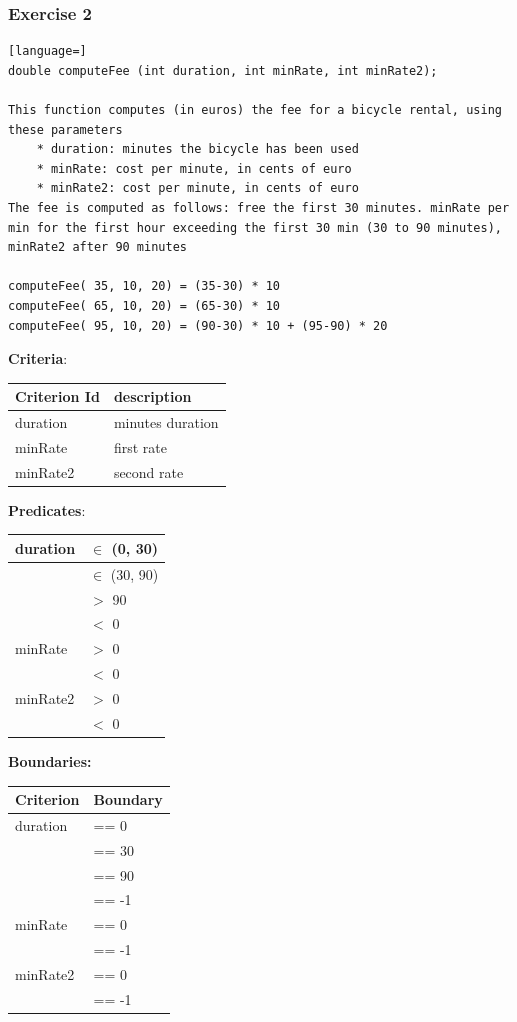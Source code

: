 \documentclass[12pt]{article}
\begin{document}
\subsubsection{Exercise 2}
\begin{lstlisting}[language=]
double computeFee (int duration, int minRate, int minRate2);

This function computes (in euros) the fee for a bicycle rental, using these parameters
    * duration: minutes the bicycle has been used
    * minRate: cost per minute, in cents of euro
    * minRate2: cost per minute, in cents of euro
The fee is computed as follows: free the first 30 minutes. minRate per min for the first hour exceeding the first 30 min (30 to 90 minutes), minRate2 after 90 minutes

computeFee( 35, 10, 20) = (35-30) * 10
computeFee( 65, 10, 20) = (65-30) * 10
computeFee( 95, 10, 20) = (90-30) * 10 + (95-90) * 20
\end{lstlisting}
\textbf{Criteria}:
\begin{center}
  \begin{tabular}{|l|l|}
    \hline
    Criterion Id & description \\
    \hline
    duration & minutes duration \\
    \hline
    minRate & first rate \\
    \hline
    minRate2 & second rate \\
    \hline
  \end{tabular}
\end{center}
\textbf{Predicates}:
\begin{center}
  \begin{tabular}{|l|l|}
    \hline
    duration & $\in$ (0, 30) \\
    \hline
    & $\in$ (30, 90) \\
    \hline
    & $>$ 90 \\
    \hline
    & $<$ 0 \\
    \hline
    minRate & $>$ 0 \\
    \hline
    & $<$ 0 \\
    \hline
    minRate2 & $>$ 0 \\
    \hline
    & $<$ 0 \\
    \hline
  \end{tabular}
\end{center}
\textbf{Boundaries:}
\begin{center}
  \begin{tabular}{|l|l|}
    \hline
    Criterion & Boundary \\
    \hline
    duration & == 0 \\
    \hline
    & == 30 \\
    \hline
    & == 90 \\
    \hline
    & == -1 \\
    \hline
    minRate & == 0 \\
    \hline
    & == -1 \\
    \hline
    minRate2 & == 0 \\
    \hline
    & == -1 \\
    \hline
  \end{tabular}
\end{center}
\end{document}
